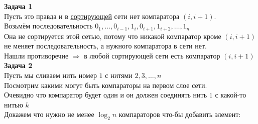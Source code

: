 \documentclass[14pt,a4paper,report]{ncc}
\begin{document}
\textbf{Задача 1}\\
Пусть это правда и в \underline{сортирующей} сети нет компаратора $(i, i+1)$.\\
Возьмём последовательность $0_1, \ldots, 0_{i-1}, 1_i, 0_{i+1}, 1_{i+2}, \ldots , 1_n$\\
Она не сортируется этой сетью, потому что никакой компаратор кроме $(i, i+1)$ не меняет последовательность, а нужного компаратора в сети нет.\\
Нашли противоречие $\Rightarrow$ в любой сортирующей сети есть компаратор $(i, i+1)$\\

\textbf{Задача 2}\\
Пусть мы сливаем нить номер $1$ с нитями $2, 3, \ldots, n$\\
Посмотрим какими могут быть компараторы на первом слое сети.\\
Очевидно что компаратор будет один и он должен соединять нить $1$ с какой-то нитью $k$\\
Докажем что нужно не менее $\log_2{n}$ компараторов что-бы добавить элемент:\\
\end{document}

